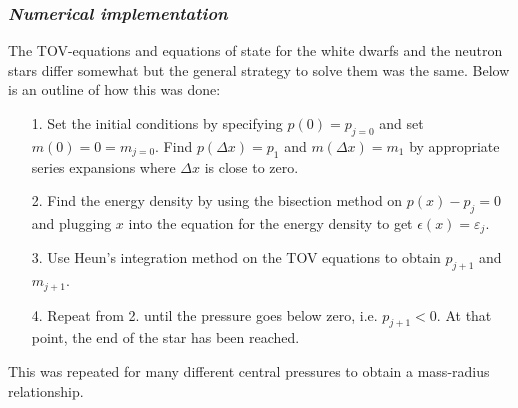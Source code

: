 \documentclass[twocolumn]{article}
\begin{document}
\begin{large}


\subsubsection*{\textit{Numerical implementation}}
The TOV-equations and equations of state for the white dwarfs and the neutron stars differ somewhat but the general strategy to solve them was the same. Below is an outline of how this was done:

\begin{itemize}
    \item[1.] Set the initial conditions by specifying $p(0) = p_{j=0}$ and set $m(0) = 0 = m_{j=0}$. Find $p(\Delta x)=p_1$ and $m(\Delta x)=m_1$ by appropriate series expansions where $\Delta x$ is close to zero.
    \item[2.] Find the energy density by using the bisection method on $p(x) - p_j = 0$ and plugging $x$ into the equation for the energy density to get $\epsilon(x)=\varepsilon_j$. 
    \item[3.] Use Heun's integration method on the TOV equations to obtain $p_{j+1}$ and $m_{j+1}$. 
    \item[4.] Repeat from 2. until the pressure goes below zero, i.e. $p_{j+1}<0$. At that point, the end of the star has been reached.
\end{itemize}
This was repeated for many different central pressures to obtain a mass-radius relationship.


\end{large}
\end{document}
